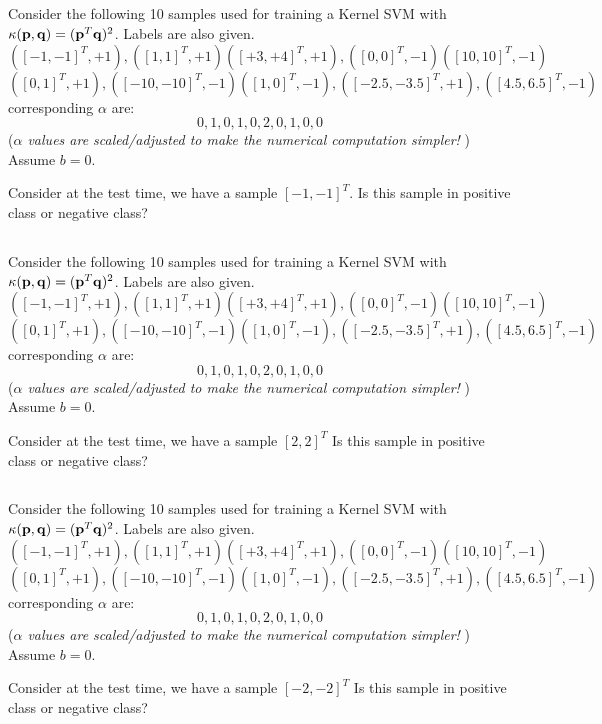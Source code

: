 \begin{frame}
\section{}
Consider the following 10 samples used for training a Kernel SVM with $\kappa({\bf p}, {\bf q}) = ({\bf p}^T{\bf q})^2$.  Labels are also given.
\[ ([-1,-1]^T,+1), ([1,1]^T, +1) ([+3,+4]^T, +1), ([0,0]^T,-1) ([10,10]^T,-1) \]
\[ ([0,1]^T,+1), ([-10,-10]^T,-1) ([1,0]^T,-1),([-2.5,-3.5]^T,+1), ([4.5,6.5]^T,-1) \]
corresponding $\alpha$ are:
\[ 0,1,0,1,0,2,0,1,0,0\]
({\em $\alpha$ values are scaled/adjusted to make the numerical computation simpler!} )
Assume $b=0$.

Consider at the test time, we have a sample $[-1, -1]^T$.
Is this sample in positive class or negative class?




\end{frame}


\begin{frame}
\section{}
Consider the following 10 samples used for training a Kernel SVM with $\kappa({\bf p}, {\bf q}) = ({\bf p}^T{\bf q})^2$.  Labels are also given.
\[ ([-1,-1]^T,+1), ([1,1]^T, +1) ([+3,+4]^T, +1), ([0,0]^T,-1) ([10,10]^T,-1) \]
\[ ([0,1]^T,+1), ([-10,-10]^T,-1) ([1,0]^T,-1),([-2.5,-3.5]^T,+1), ([4.5,6.5]^T,-1) \]
corresponding $\alpha$ are:
\[ 0,1,0,1,0,2,0,1,0,0\]
({\em $\alpha$ values are scaled/adjusted to make the numerical computation simpler!} )
Assume $b=0$.

Consider at the test time, we have a sample $[2, 2]^T$
Is this sample in positive class or negative class?



\end{frame}


\begin{frame}
\section{}
Consider the following 10 samples used for training a Kernel SVM with $\kappa({\bf p}, {\bf q}) = ({\bf p}^T{\bf q})^2$.  Labels are also given.
\[ ([-1,-1]^T,+1), ([1,1]^T, +1) ([+3,+4]^T, +1), ([0,0]^T,-1) ([10,10]^T,-1) \]
\[ ([0,1]^T,+1), ([-10,-10]^T,-1) ([1,0]^T,-1),([-2.5,-3.5]^T,+1), ([4.5,6.5]^T,-1) \]
corresponding $\alpha$ are:
\[ 0,1,0,1,0,2,0,1,0,0\]
({\em $\alpha$ values are scaled/adjusted to make the numerical computation simpler!} )
Assume $b=0$.

Consider at the test time, we have a sample $[-2, -2]^T$
Is this sample in positive class or negative class?




\end{frame}


